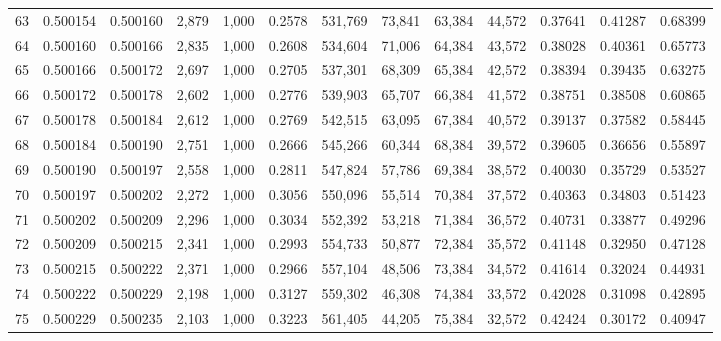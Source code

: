 \begin{tabular}{rrrrrrrrrrrrr}
63  &  0.500154 &  0.500160 &   2,879 &  1,000 &                                     0.2578 &  531,769 &   73,841 &   63,384 &   44,572 &  0.37641 &  0.41287 &  0.68399 \\
64  &  0.500160 &  0.500166 &   2,835 &  1,000 &                                     0.2608 &  534,604 &   71,006 &   64,384 &   43,572 &  0.38028 &  0.40361 &  0.65773 \\
65  &  0.500166 &  0.500172 &   2,697 &  1,000 &                                     0.2705 &  537,301 &   68,309 &   65,384 &   42,572 &  0.38394 &  0.39435 &  0.63275 \\
66  &  0.500172 &  0.500178 &   2,602 &  1,000 &                                     0.2776 &  539,903 &   65,707 &   66,384 &   41,572 &  0.38751 &  0.38508 &  0.60865 \\
67  &  0.500178 &  0.500184 &   2,612 &  1,000 &                                     0.2769 &  542,515 &   63,095 &   67,384 &   40,572 &  0.39137 &  0.37582 &  0.58445 \\
68  &  0.500184 &  0.500190 &   2,751 &  1,000 &                                     0.2666 &  545,266 &   60,344 &   68,384 &   39,572 &  0.39605 &  0.36656 &  0.55897 \\
69  &  0.500190 &  0.500197 &   2,558 &  1,000 &                                     0.2811 &  547,824 &   57,786 &   69,384 &   38,572 &  0.40030 &  0.35729 &  0.53527 \\
70  &  0.500197 &  0.500202 &   2,272 &  1,000 &                                     0.3056 &  550,096 &   55,514 &   70,384 &   37,572 &  0.40363 &  0.34803 &  0.51423 \\
71  &  0.500202 &  0.500209 &   2,296 &  1,000 &                                     0.3034 &  552,392 &   53,218 &   71,384 &   36,572 &  0.40731 &  0.33877 &  0.49296 \\
72  &  0.500209 &  0.500215 &   2,341 &  1,000 &                                     0.2993 &  554,733 &   50,877 &   72,384 &   35,572 &  0.41148 &  0.32950 &  0.47128 \\
73  &  0.500215 &  0.500222 &   2,371 &  1,000 &                                     0.2966 &  557,104 &   48,506 &   73,384 &   34,572 &  0.41614 &  0.32024 &  0.44931 \\
74  &  0.500222 &  0.500229 &   2,198 &  1,000 &                                     0.3127 &  559,302 &   46,308 &   74,384 &   33,572 &  0.42028 &  0.31098 &  0.42895 \\
75  &  0.500229 &  0.500235 &   2,103 &  1,000 &                                     0.3223 &  561,405 &   44,205 &   75,384 &   32,572 &  0.42424 &  0.30172 &  0.40947 \\

\end{tabular}
